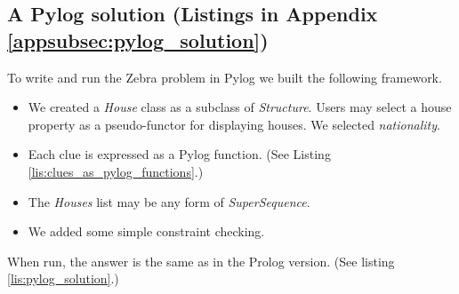 \smallv


\subsection{A Pylog solution (Listings in Appendix \ref{appsubsec:pylog_solution})} \label{subsec:pylog_solution}

To write and run the Zebra problem in Pylog we built the following framework.
\begin{itemize}
    \item \sloppy We created a \textit{House} class as a subclass of \textit{Structure}. Users may select a house property as a pseudo-functor for displaying houses. We selected \textit{nationality}.

    \item Each clue is expressed as a Pylog function. (See Listing \ref{lis:clues_as_pylog_functions}.) 


  


    \item The \textit{Houses} list may be any form of \textit{SuperSequence}.
    
    \item We added some simple constraint checking.
\end{itemize}
When run, the answer is the same as in the Prolog version. (See listing \ref{lis:pylog_solution}.)

